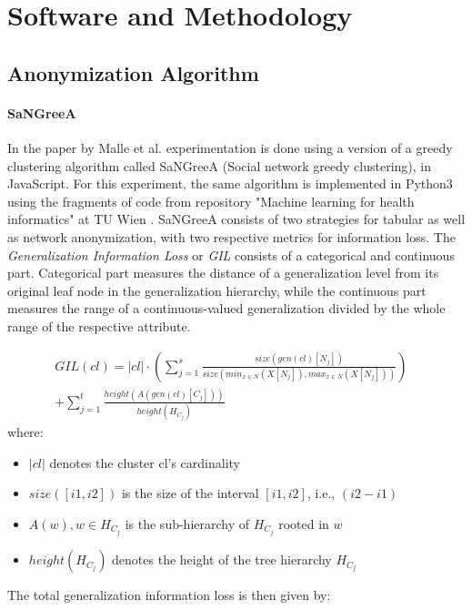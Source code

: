 \documentclass{article}
\begin{document}
\section{Software and Methodology}

\subsection{Anonymization Algorithm}
\paragraph{SaNGreeA}
In the paper by Malle et al. \cite{malle2017not} experimentation is done using a version of a greedy clustering algorithm called SaNGreeA (Social network greedy clustering), \cite{campan2009data} in JavaScript. For this experiment, the same algorithm is implemented in Python3 \cite{sarcevic2018sangreea} using the fragments of code from repository "Machine learning for health informatics" at TU Wien \cite{malle2016sangreea}. 
SaNGreeA consists of two strategies for tabular as well as network anonymization, with two respective metrics for information loss. The \textit{Generalization Information Loss} or \textit{GIL} consists of a categorical and continuous part. Categorical part measures the distance of a generalization level from its original leaf node in the generalization hierarchy, while the continuous part measures the range of a continuous-valued generalization divided by the whole range of the respective attribute. 

\begin{align*}
	GIL(cl) = |cl| \cdot (\sum_{j=1}^{s}\frac{size(gen(cl)[N_j])}{size(min_{x\in N}(X[N_j]),max_{x\in N}(X[N_j]))})& \\ 
					+ \sum_{j=1}^{t}\frac{height(A(gen(cl)[C_j]))}{height(H_{C_j})}&
\end{align*}
where:

\begin{itemize}
	\item $|cl|$ denotes the cluster cl's cardinality
	\item $size([i1,i2])$ is the size of the interval $[i1,i2]$, i.e., $(i2-i1)$
	\item $A(w), w\in H_{C_j}$ is the sub-hierarchy of $H_{C_j}$ rooted in $w$
	\item $height(H_{C_j})$ denotes the height of the tree hierarchy $H_{C_j}$
\end{itemize}

The total generalization information loss is then given by:
\end{document}
